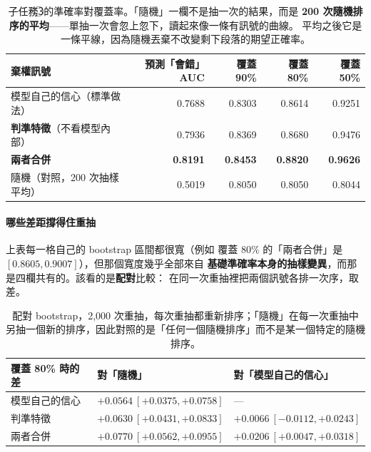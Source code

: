 \documentclass[11pt,a4paper]{ctexart}
\begin{document}
\begin{table}[h]
\centering\small
\begin{tabular}{@{}lrrrr@{}}
\toprule
棄權訊號 & 預測「會錯」AUC & 覆蓋 90\% & 覆蓋 80\% & 覆蓋 50\% \\
\midrule
模型自己的信心（標準做法） & 0.7688 & 0.8303 & 0.8614 & 0.9251 \\
\rowcolor{yellow!12}
\textbf{判準特徵}（不看模型內部） & 0.7936 & 0.8369 & 0.8680 & 0.9476 \\
\rowcolor{green!12}
\textbf{兩者合併} & \textbf{0.8191} & \textbf{0.8453} & \textbf{0.8820} & \textbf{0.9626} \\
隨機（對照，200 次抽樣平均） & 0.5019 & 0.8050 & 0.8050 & 0.8044 \\
\bottomrule
\end{tabular}
\caption{子任務\textcircled{3}的準確率對覆蓋率。「隨機」一欄不是抽一次的結果，而是
\textbf{200 次隨機排序的平均}——單抽一次會忽上忽下，讀起來像一條有訊號的曲線。
平均之後它是一條平線，因為隨機丟棄不改變剩下段落的期望正確率。}
\end{table}

\paragraph{哪些差距撐得住重抽} 上表每一格自己的 bootstrap 區間都很寬（例如
覆蓋 80\% 的「兩者合併」是 $[0.8605, 0.9007]$），但那個寬度幾乎全部來自
\textbf{基礎準確率本身的抽樣變異}，而那是四欄共有的。該看的是\textbf{配對}比較：
在同一次重抽裡把兩個訊號各排一次序，取差。

\begin{table}[h]
\centering\small
\begin{tabular}{@{}lll@{}}
\toprule
覆蓋 80\% 時的差 & 對「隨機」 & 對「模型自己的信心」\\
\midrule
模型自己的信心 & $+0.0564\ [+0.0375, +0.0758]$ & --- \\
判準特徵 & $+0.0630\ [+0.0431, +0.0833]$ & $+0.0066\ [-0.0112, +0.0243]$ \\
\rowcolor{green!12}
兩者合併 & $\mathbf{+0.0770\ [+0.0562, +0.0955]}$ & $\mathbf{+0.0206\ [+0.0047, +0.0318]}$ \\
\bottomrule
\end{tabular}
\caption{配對 bootstrap，2{,}000 次重抽，每次重抽都重新排序；「隨機」在每一次重抽中
另抽一個新的排序，因此對照的是「任何一個隨機排序」而不是某一個特定的隨機排序。}
\end{table}
\end{document}
